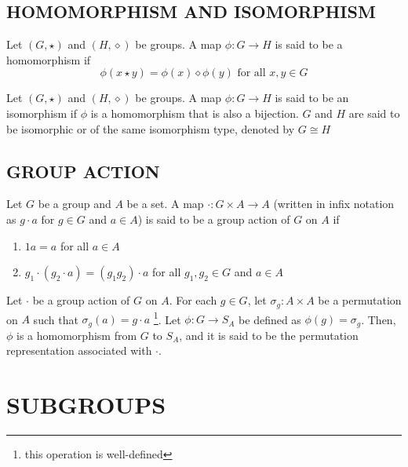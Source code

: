 \subsection{HOMOMORPHISM AND ISOMORPHISM}

\begin{definition}[Homomorphism]
	Let $(G, \star)$ and $(H, \diamond)$ be groups. A map $\phi: G \to H$ is said to be a homomorphism if
	\[
	\phi(x \star y) = \phi(x) \diamond \phi(y) \text{ for all $x, y \in G$}
	\]
\end{definition}

\begin{definition}[Isomorphism]
	Let $(G, \star)$ and $(H, \diamond)$ be groups. A map $\phi: G \to H$ is said to be an isomorphism if $\phi$ is a homomorphism that is also a bijection.
	$G$ and $H$ are said to be isomorphic or of the same isomorphism type, denoted by $G \cong H$
\end{definition}

\subsection{GROUP ACTION}
\begin{definition}
	Let $G$ be a group and $A$ be a set. A map $\cdot: G \times A \to A$ (written in infix notation as $g \cdot a$ for $g \in G$ and $a \in A$) is said to be a group action of $G$ on $A$ if
	\begin{enumerate}
		\item $1 a = a$ for all $a \in A$
		\item $g_1 \cdot (g_2 \cdot a) = (g_1 g_2) \cdot a$ for all $g_1, g_2 \in G$ and $a \in A$
	\end{enumerate}
\end{definition}

\begin{definition}
	Let $\cdot$ be a group action of $G$ on $A$. For each $g \in G$, let $\sigma_g: A \times A$ be a permutation on $A$ such that $\sigma_g(a) = g \cdot a$ \footnote{this operation is well-defined}. Let $\phi: G \to S_A$ be defined as $\phi(g) = \sigma_g$. Then, $\phi$ is a homomorphism from $G$ to $S_A$, and it is said to be the permutation representation associated with $\cdot$.
\end{definition}

\section{SUBGROUPS}

